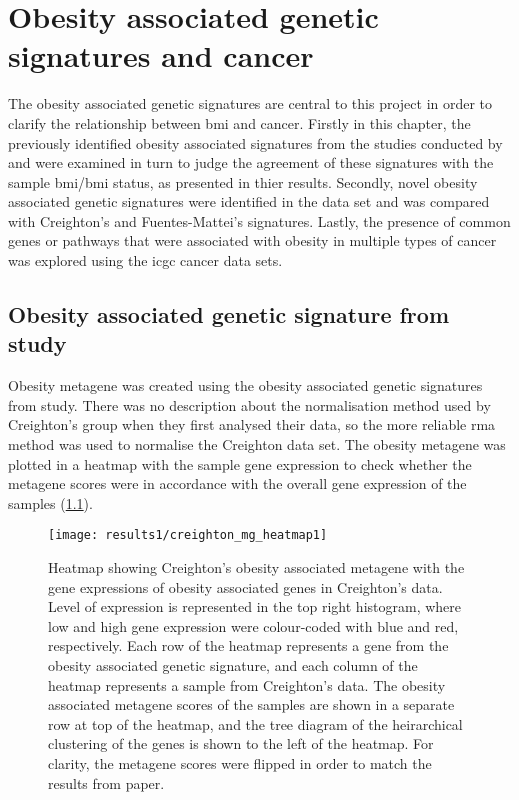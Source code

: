 \chapter{Obesity associated genetic signatures and cancer}
\label{cha:obesity_genetic_signatures_and_cancer}

The obesity associated genetic signatures are central to this project in order to clarify the relationship between \gls{bmi} and cancer.
Firstly in this chapter, the previously identified obesity associated signatures from the studies conducted by \citet{Creighton2012} and \citet{Fuentes-Mattei2014} were examined in turn to judge the agreement of these signatures with the sample \gls{bmi}/\gls{bmi} status, as presented in thier results.
Secondly, novel obesity associated genetic signatures were identified in the \citet{Creighton2012} data set and was compared with Creighton's and Fuentes-Mattei's  signatures.
Lastly, the presence of common genes or pathways that were associated with obesity in multiple types of cancer was explored using the \gls{icgc} cancer data sets.

\section{Obesity associated genetic signature from \citet{Creighton2012} study}
\label{sec:creighton_obesity_metagene}

Obesity metagene was created using the obesity associated genetic signatures from \citet{Creighton2012} study.
There was no description about the normalisation method used by Creighton's group when they first analysed their data, so the more reliable \gls{rma} method was used to  normalise the Creighton data set.
The obesity metagene was plotted in a heatmap with the sample gene expression  to check whether the metagene scores were in accordance with the overall gene expression of the samples (\cref{fig:crmetaheat}).

\begin{figure}[htb]
	\centering
	\texttt{[image: results1/creighton\_mg\_heatmap1]}
	\caption[Creighton's metagene and sample gene expression in Creighton's data]{Heatmap showing Creighton's obesity associated metagene with the gene expressions of obesity associated genes in Creighton's data.
	Level of expression is represented in the top right histogram, where low and high gene expression were colour-coded with blue and red, respectively.
	Each row of the heatmap represents a gene from the obesity associated genetic signature, and each column of the heatmap represents a sample from Creighton's data.
	The obesity associated metagene scores of the samples are shown in a separate row at top of the heatmap, and the tree diagram of the heirarchical clustering of the genes is shown to the left of the heatmap.
	For clarity, the metagene scores were flipped in order to match the results from \citet{Creighton2012} paper.}
	\label{fig:crmetaheat}
\end{figure}

